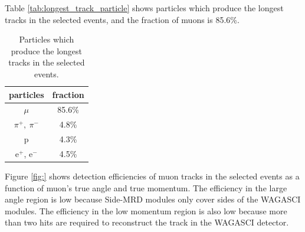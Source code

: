 Table \ref{tab:longest_track_particle} shows particles which produce the longest tracks in the selected events, and the fraction of muons is 85.6\%.

\begin{table}[htb]
  \begin{center}
    \caption{Particles which produce the longest tracks in the selected events.}
    \begin{tabular}{cc} \hline
      particles & fraction \\ \hline
      $\mu$ & 85.6\% \\
      $\pi^{+},\ \pi^{-}$ & 4.8\% \\
      p & 4.3\% \\
      e$^{+}$, e$^{-}$ & 4.5\% \\
      \hline
    \end{tabular}
    \label{tab:expected_num_events_neutrino_beam}
  \end{center}
\end{table}


Figure \ref{fig:} shows detection efficiencies of muon tracks in the selected events as a function of muon's true angle and true momentum.
The efficiency in the large angle region is low because Side-MRD modules only cover sides of the WAGASCI modules.
The efficiency in the low momentum region is also low because more than two hits  are required to reconstruct the track in the WAGASCI detector.

